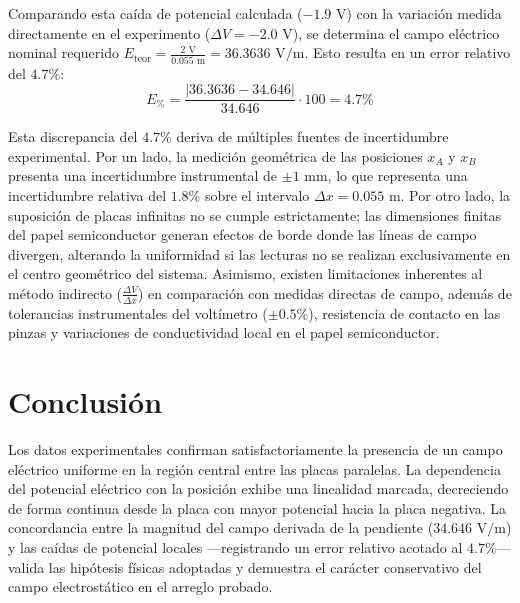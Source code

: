 \documentclass[12pt]{article}
\begin{document}
Comparando esta caída de potencial calculada ($-1.9\text{ V}$) con la variación medida directamente en el experimento ($\Delta V = -2.0\text{ V}$), se determina el campo eléctrico nominal requerido $E_{\text{teor}} = \frac{2\text{ V}}{0.055\text{ m}} = 36.3636\text{ V/m}$. Esto resulta en un error relativo del $4.7\%$:
\begin{equation}
    E_{\%} = \frac{|36.3636 - 34.646|}{34.646} \cdot 100 = 4.7\%
\end{equation}

Esta discrepancia del $4.7\%$ deriva de múltiples fuentes de incertidumbre experimental. Por un lado, la medición geométrica de las posiciones $x_A$ y $x_B$ presenta una incertidumbre instrumental de $\pm 1\text{ mm}$, lo que representa una incertidumbre relativa del $1.8\%$ sobre el intervalo $\Delta x = 0.055\text{ m}$. Por otro lado, la suposición de placas infinitas no se cumple estrictamente; las dimensiones finitas del papel semiconductor generan efectos de borde donde las líneas de campo divergen, alterando la uniformidad si las lecturas no se realizan exclusivamente en el centro geométrico del sistema. Asimismo, existen limitaciones inherentes al método indirecto ($\frac{\Delta V}{\Delta x}$) en comparación con medidas directas de campo, además de tolerancias instrumentales del voltímetro ($\pm 0.5\%$), resistencia de contacto en las pinzas y variaciones de conductividad local en el papel semiconductor.

\section{Conclusión}
Los datos experimentales confirman satisfactoriamente la presencia de un campo eléctrico uniforme en la región central entre las placas paralelas. La dependencia del potencial eléctrico con la posición exhibe una linealidad marcada, decreciendo de forma continua desde la placa con mayor potencial hacia la placa negativa. La concordancia entre la magnitud del campo derivada de la pendiente ($34.646\text{ V/m}$) y las caídas de potencial locales —registrando un error relativo acotado al $4.7\%$— valida las hipótesis físicas adoptadas y demuestra el carácter conservativo del campo electrostático en el arreglo probado.
\end{document}
